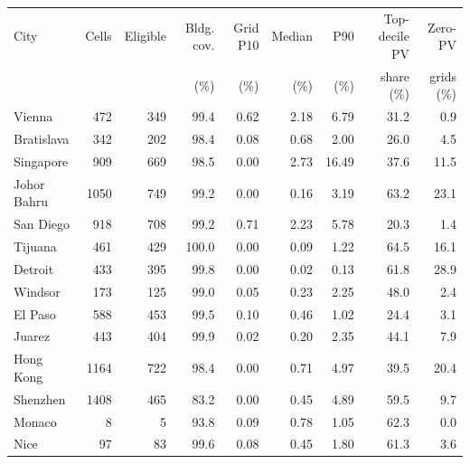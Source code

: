 \begin{tabular}{@{}lrrrrrrrr@{}}
\toprule
City & Cells & Eligible & Bldg. cov. & Grid P10 & Median & P90 & Top-decile PV & Zero-PV \\
 & & & (\%) & (\%) & (\%) & (\%) & share (\%) & grids (\%) \\
\midrule
Vienna & 472 & 349 & 99.4 & 0.62 & 2.18 & 6.79 & 31.2 & 0.9 \\
Bratislava & 342 & 202 & 98.4 & 0.08 & 0.68 & 2.00 & 26.0 & 4.5 \\
Singapore & 909 & 669 & 98.5 & 0.00 & 2.73 & 16.49 & 37.6 & 11.5 \\
Johor Bahru & 1050 & 749 & 99.2 & 0.00 & 0.16 & 3.19 & 63.2 & 23.1 \\
San Diego & 918 & 708 & 99.2 & 0.71 & 2.23 & 5.78 & 20.3 & 1.4 \\
Tijuana & 461 & 429 & 100.0 & 0.00 & 0.09 & 1.22 & 64.5 & 16.1 \\
Detroit & 433 & 395 & 99.8 & 0.00 & 0.02 & 0.13 & 61.8 & 28.9 \\
Windsor & 173 & 125 & 99.0 & 0.05 & 0.23 & 2.25 & 48.0 & 2.4 \\
El Paso & 588 & 453 & 99.5 & 0.10 & 0.46 & 1.02 & 24.4 & 3.1 \\
Juarez & 443 & 404 & 99.9 & 0.02 & 0.20 & 2.35 & 44.1 & 7.9 \\
Hong Kong & 1164 & 722 & 98.4 & 0.00 & 0.71 & 4.97 & 39.5 & 20.4 \\
Shenzhen & 1408 & 465 & 83.2 & 0.00 & 0.45 & 4.89 & 59.5 & 9.7 \\
Monaco & 8 & 5 & 93.8 & 0.09 & 0.78 & 1.05 & 62.3 & 0.0 \\
Nice & 97 & 83 & 99.6 & 0.08 & 0.45 & 1.80 & 61.3 & 3.6 \\
\bottomrule
\end{tabular}

